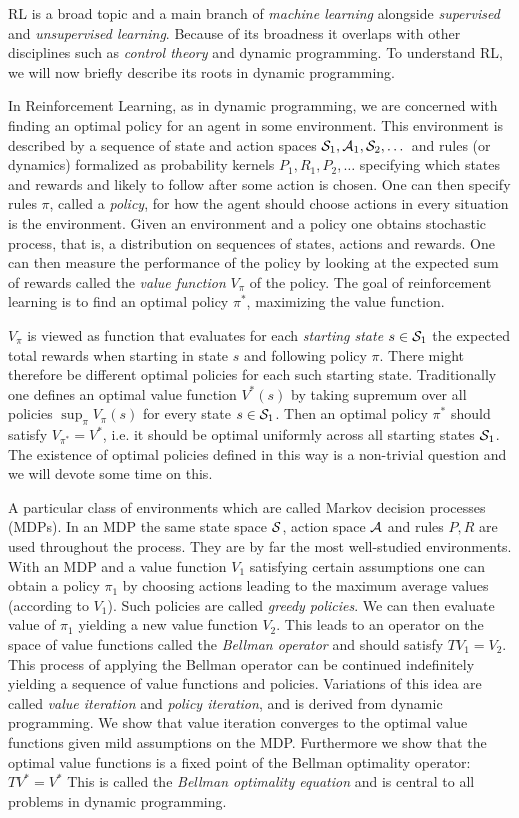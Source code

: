 RL is a broad topic and a main branch of
\emph{machine learning} alongside \emph{supervised} and \emph{unsupervised
learning}. Because of its broadness it overlaps with other disciplines
such as \emph{control theory} and dynamic programming.
To understand RL, we will now briefly describe its roots in dynamic programming.

In Reinforcement Learning, as in dynamic programming,
we are concerned with finding an optimal policy
for an agent in some environment.
This environment is described by
a sequence of state and action spaces
$\mathcal{S}_1, \mathcal{A}_1, \mathcal{S}_2, \dots$
and rules (or dynamics) formalized as probability kernels
$P_1, R_1, P_2, \dots$ specifying which states and rewards
and likely to follow after some action is chosen.
One can then specify rules $\pi$, called a \emph{policy},
for how the agent should choose actions in every situation is the environment.
Given an environment and a policy one obtains stochastic process,
that is, a distribution on sequences of states, actions and
rewards.
One can then measure the performance of the policy by looking at
the expected sum of rewards called the \emph{value function}
$V_\pi$ of the policy.
The goal of reinforcement learning is to find an optimal policy $\pi^*$,
maximizing the value function.

$V_\pi$ is viewed as function that evaluates for each \emph{starting state}
$s \in \mathcal{S}_1$ the expected total rewards when starting in state $s$
and following policy $\pi$.
There might therefore be different optimal policies for each such starting
state.
Traditionally one defines an optimal value function $V^*(s)$
by taking supremum over all policies $\sup_\pi V_\pi(s)$ for every state
$s \in \mathcal{S}_1$.
Then an optimal policy $\pi^*$ should satisfy $V_{\pi^*} = V^*$,
i.e. it should be optimal uniformly across all starting states $\mathcal{S}_1$.
The existence of optimal policies defined in this way is a non-trivial
question and we will devote some time on this.

A particular class of environments which are called Markov decision processes
(MDPs).
In an MDP the same state space $\mathcal{S}$, action space $\mathcal{A}$ and rules
$P, R$ are used throughout the process.
They are by far the most well-studied environments.
With an MDP and a value function $V_1$ satisfying certain assumptions 
one can obtain a policy $\pi_1$ by choosing actions
leading to the maximum average values (according to $V_1$).
Such policies are called \emph{greedy policies}.
We can then evaluate value of $\pi_1$ yielding a new value function $V_2$.
This leads to an operator on the space of value functions called the
\emph{Bellman operator} and should satisfy $TV_1 = V_2$.
This process of applying the Bellman operator
can be continued indefinitely yielding a sequence of value
functions and policies.
Variations of this idea are called \emph{value iteration} and
\emph{policy iteration},
and is derived from dynamic programming.
We show that value iteration converges to the optimal value functions
given mild assumptions on the MDP.
Furthermore we show that the optimal value functions is a fixed point
of the Bellman optimality operator: $TV^* = V^*$
This is called the \emph{Bellman optimality equation} and
is central to all problems in dynamic programming.

